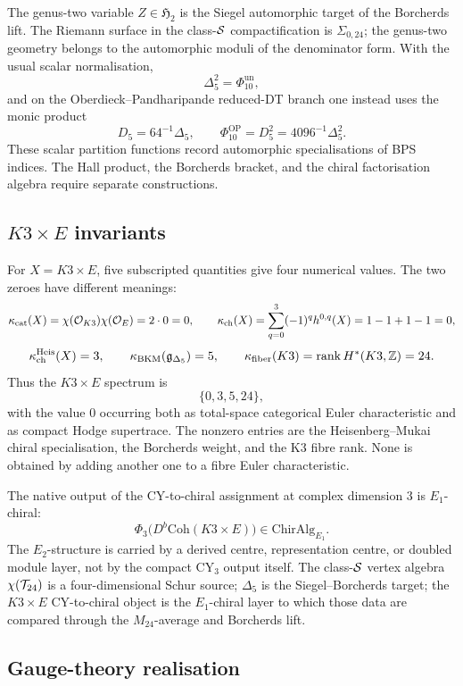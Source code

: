 The genus-two variable \(Z\in\mathfrak H_2\) is the Siegel automorphic
target of the Borcherds lift.  The Riemann surface in the
class-\(\mathcal{S}\) compactification is \(\Sigma_{0,24}\); the
genus-two geometry belongs to the automorphic moduli of the denominator
form.  With the usual scalar normalisation,
\[
  \Delta_5^2=\Phi_{10}^{\mathrm{un}},
\]
and on the Oberdieck--Pandharipande reduced-DT branch one instead uses
the monic product
\[
  D_5=64^{-1}\Delta_5,\qquad
  \Phi_{10}^{\mathrm{OP}}=D_5^2=4096^{-1}\Delta_5^2.
\]
These scalar partition functions record automorphic specialisations of
BPS indices.  The Hall product, the Borcherds bracket, and the chiral
factorisation algebra require separate constructions.

\subsection*{\texorpdfstring{$K3\times E$}{K3xE} invariants}

For \(X=K3\times E\), five subscripted quantities give four numerical
values.  The two zeroes have different meanings:
\[
  \kappa_{\mathrm{cat}}(X)=\chi(\mathcal O_{K3})\chi(\mathcal O_E)=2\cdot 0=0,
  \qquad
  \kappa_{\mathrm{ch}}(X)=\sum_{q=0}^3(-1)^q h^{0,q}(X)=1-1+1-1=0,
\]
\[
  \kappa_{\mathrm{ch}}^{\mathrm{Heis}}(X)=3,
  \qquad
  \kappa_{\mathrm{BKM}}(\mathfrak g_{\Delta_5})=5,
  \qquad
  \kappa_{\mathrm{fiber}}(K3)=\mathrm{rank}\,H^\ast(K3,\mathbb{Z})=24.
\]
Thus the \(K3\times E\) spectrum is
\[
  \{0,3,5,24\},
\]
with the value \(0\) occurring both as total-space categorical Euler
characteristic and as compact Hodge supertrace.  The nonzero entries
are the Heisenberg--Mukai chiral specialisation, the Borcherds weight,
and the K3 fibre rank.  None is obtained by adding another one to a
fibre Euler characteristic.

The native output of the CY-to-chiral assignment at complex dimension
\(3\) is \(E_1\)-chiral:
\[
  \Phi_3\bigl(D^b\mathrm{Coh}(K3\times E)\bigr)
  \in \mathrm{ChirAlg}_{E_1}.
\]
The \(E_2\)-structure is carried by a derived centre, representation
centre, or doubled module layer, not by the compact CY\(_3\) output
itself.  The class-\(\mathcal{S}\)
vertex algebra \(\chi(\mathcal{T}_{24})\) is a four-dimensional Schur source;
\(\Delta_5\) is the Siegel--Borcherds target; the \(K3\times E\)
CY-to-chiral object is the \(E_1\)-chiral layer to which those data are
compared through the \(M_{24}\)-average and Borcherds lift.

\subsection*{Gauge-theory realisation}

